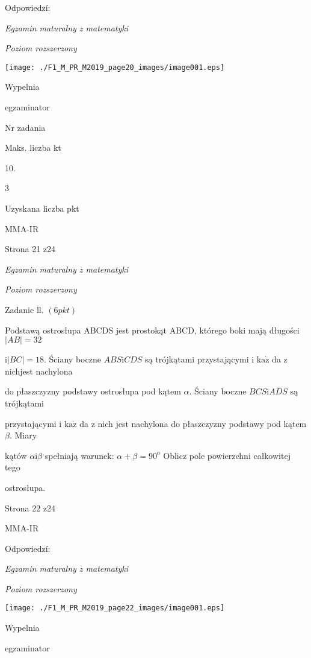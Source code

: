 \documentclass[a4paper,12pt]{article}
\begin{document}
Odpowiedzí:

{\it Egzamin maturalny z matematyki}

{\it Poziom rozszerzony}
\begin{center}
\texttt{[image: ./F1\_M\_PR\_M2019\_page20\_images/image001.eps]}
\end{center}
Wypelnia

egzaminator

Nr zadania

Maks. liczba kt

10.

3

Uzyskana liczba pkt

MMA-IR

Strona 21 z24





{\it Egzamin maturalny z matematyki}

{\it Poziom rozszerzony}

Zadanie ll. $(6pkt)$

Podstawą ostrosłupa ABCDS jest prostokąt ABCD, którego boki mają długości $|AB|=32$

$\mathrm{i}|BC|=18$. Ściany boczne $ABS\mathrm{i}CDS$ są trójkątami przystającymi i $\mathrm{k}\mathrm{a}\dot{\mathrm{z}}$ da z nichjest nachylona

do płaszczyzny podstawy ostrosłupa pod kątem $\alpha$. Ściany boczne $BCS\mathrm{i}ADS$ są trójkątami

przystającymi i $\mathrm{k}\mathrm{a}\dot{\mathrm{z}}$ da z nich jest nachylona do płaszczyzny podstawy pod kątem $\beta$. Miary

kątów $\alpha \mathrm{i} \beta$ spełniają warunek: $\alpha+\beta=90^{\mathrm{o}}$ Oblicz pole powierzchni całkowitej tego

ostrosłupa.

Strona 22 z24

MMA-IR





Odpowiedzí:

{\it Egzamin maturalny z matematyki}

{\it Poziom rozszerzony}
\begin{center}
\texttt{[image: ./F1\_M\_PR\_M2019\_page22\_images/image001.eps]}
\end{center}
Wypelnia

egzaminator
\end{document}
